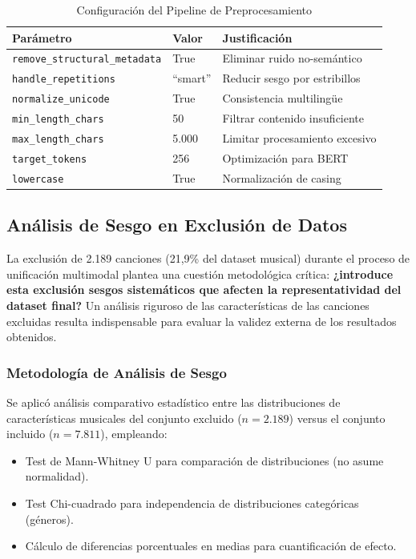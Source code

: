 \begin{table}[htbp]
\centering
\caption{Configuración del Pipeline de Preprocesamiento}
\label{tab:config-preprocessing}
\begin{tabular}{lll}
\toprule
\textbf{Parámetro} & \textbf{Valor} & \textbf{Justificación} \\
\midrule
\texttt{remove\_structural\_metadata} & True & Eliminar ruido no-semántico \\
\texttt{handle\_repetitions} & ``smart'' & Reducir sesgo por estribillos \\
\texttt{normalize\_unicode} & True & Consistencia multilingüe \\
\texttt{min\_length\_chars} & 50 & Filtrar contenido insuficiente \\
\texttt{max\_length\_chars} & 5.000 & Limitar procesamiento excesivo \\
\texttt{target\_tokens} & 256 & Optimización para BERT \\
\texttt{lowercase} & True & Normalización de casing \\
\bottomrule
\end{tabular}
\end{table}

\subsection{Análisis de Sesgo en Exclusión de Datos}
\label{subsec:analisis-sesgo}

La exclusión de 2.189 canciones (21,9\% del dataset musical) durante el proceso de unificación multimodal plantea una cuestión metodológica crítica: \textbf{¿introduce esta exclusión sesgos sistemáticos que afecten la representatividad del dataset final?} Un análisis riguroso de las características de las canciones excluidas resulta indispensable para evaluar la validez externa de los resultados obtenidos.

\subsubsection{Metodología de Análisis de Sesgo}

Se aplicó análisis comparativo estadístico entre las distribuciones de características musicales del conjunto excluido ($n=2.189$) versus el conjunto incluido ($n=7.811$), empleando:
\begin{itemize}
    \item Test de Mann-Whitney U para comparación de distribuciones (no asume normalidad).
    \item Test Chi-cuadrado para independencia de distribuciones categóricas (géneros).
    \item Cálculo de diferencias porcentuales en medias para cuantificación de efecto.
\end{itemize}

